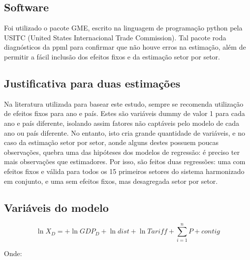 \documentclass[12pt, a4paper]{article}
\begin{document}
\subsection{Software}
Foi utilizado o pacote GME, escrito na linguagem de programação python pela USITC (United States Internacional Trade Commission). Tal pacote roda diagnósticos da ppml para confirmar que não houve erros na estimação, além de permitir a fácil inclusão dos efeitos fixos e da estimação setor por setor.

\subsection{Justificativa para duas estimações}

Na literatura utilizada para basear este estudo, sempre se recomenda utilização de efeitos fixos para ano e país. Estes são variáveis dummy de valor 1 para cada ano e país diferente, isolando assim fatores não captáveis pelo modelo de cada ano ou país diferente. No entanto, isto cria grande quantidade de variáveis, e no caso da estimação setor por setor, aonde alguns destes possuem poucas observações, quebra uma das hipóteses dos modelos de regressão: é preciso ter mais observações que estimadores. Por isso, são feitos duas regressões: uma com efeitos fixos e válida para todos os 15 primeiros setores do sistema harmonizado em conjunto, e uma sem efeitos fixos, mas desagregada setor por setor.

\subsection{Variáveis do modelo}

\begin{equation}
    \ln X_{D} = 
    + \ln GDP_{D} 
    + \ln dist 
    + \ln Tariff 
    + \sum_{i=1}^{n} P 
    + contig 
\end{equation}

Onde:
\end{document}

